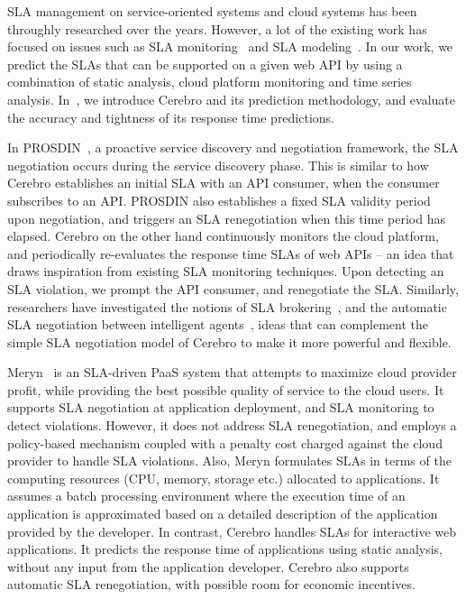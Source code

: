 SLA management on service-oriented systems and cloud systems has been 
throughly researched over the years. However, a lot of the existing work has focused on issues 
such as SLA monitoring~\cite{Michlmayr:2009:CQM:1657755.1657756,Tripathy:2011:MMS:1980822.1980832,Raimondi:2008:EOM:1453101.1453125,Bertolino:2007:SUS:1294904.1294914} and SLA modeling~\cite{Chau:2008:ASM:1463788.1463802,Stamou:2013:SGM:2516588.2516592,Skene:2004:PSL:998675.999422}. 
In our work, we predict the SLAs that can be supported on a given web API by using a combination of
static analysis, cloud platform monitoring and time series analysis.  
In~\cite{cerebro-soccsub15}, we introduce Cerebro and its prediction methodology, and evaluate the
accuracy and tightness of its response time predictions.

In PROSDIN~\cite{Mahbub:2011:PSN:2061042.2062022}, a proactive service discovery and negotiation
framework, the SLA negotiation occurs during the service discovery phase. This is similar to how
Cerebro establishes an initial SLA with an API consumer, when the consumer subscribes to an API. PROSDIN also
establishes a fixed SLA validity period upon negotiation, and triggers an SLA renegotiation when this time period has 
elapsed. Cerebro on the other hand continuously monitors the cloud platform,
and periodically re-evaluates the response time SLAs of web APIs -- an idea that draws inspiration from existing SLA
monitoring techniques. Upon detecting an SLA violation, we prompt the API consumer, and renegotiate the SLA.
Similarly, researchers have investigated the notions of SLA brokering~\cite{6546098}, and the automatic SLA negotiation
between intelligent agents~\cite{Yaqub:2014:ONS:2680847.2681496}, ideas that can complement the
simple SLA negotiation model of Cerebro to make it more powerful and flexible.

Meryn~\cite{Dib:2013:MOS:2465823.2465825} is an SLA-driven PaaS system that attempts to maximize cloud
provider profit, while providing the best possible quality of service to the cloud users. It supports
SLA negotiation at application deployment, and SLA monitoring to detect
violations. However, it does not address SLA renegotiation, and employs a policy-based mechanism coupled
with a penalty cost charged against the cloud provider to
handle SLA violations. Also, Meryn formulates SLAs in terms of the computing resources (CPU, memory,
storage etc.) allocated to applications. It assumes a batch processing environment where the
execution time of an application is approximated based on a detailed description of the application provided
by the developer. In contrast, Cerebro handles SLAs for interactive web applications. It predicts
the response time of applications using static analysis, without any input from the application developer. 
Cerebro also supports automatic SLA renegotiation, with possible room for economic incentives.

